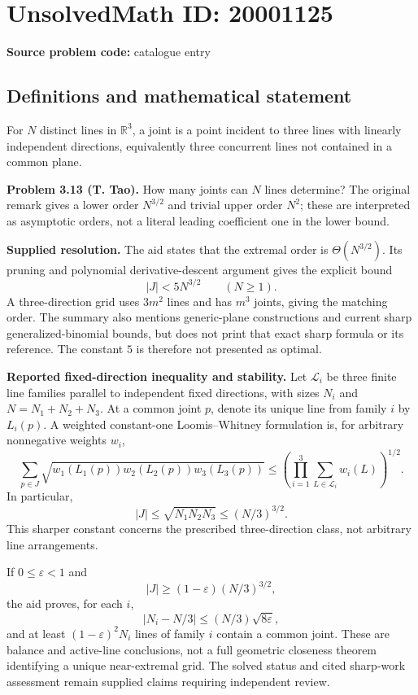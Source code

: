 \documentclass[11pt]{article}
\newcommand{\R}{\mathbb{R}}
\begin{document}
\section*{UnsolvedMath ID: 20001125}
\textbf{Source problem code:} catalogue entry
\subsection{Definitions and mathematical statement}
For $N$ distinct lines in $\R^3$, a joint is a point incident to three lines with linearly independent directions, equivalently three concurrent lines not contained in a common plane.

\textbf{Problem 3.13 (T. Tao).} How many joints can $N$ lines determine? The original remark gives a lower order $N^{3/2}$ and trivial upper order $N^2$; these are interpreted as asymptotic orders, not a literal leading coefficient one in the lower bound.

\textbf{Supplied resolution.} The aid states that the extremal order is $\Theta(N^{3/2})$. Its pruning and polynomial derivative-descent argument gives the explicit bound
\[
 |J|<5N^{3/2}\qquad(N\geq1).
\]
A three-direction grid uses $3m^2$ lines and has $m^3$ joints, giving the matching order. The summary also mentions generic-plane constructions and current sharp generalized-binomial bounds, but does not print that exact sharp formula or its reference. The constant $5$ is therefore not presented as optimal.

\textbf{Reported fixed-direction inequality and stability.} Let $\mathcal L_i$ be three finite line families parallel to independent fixed directions, with sizes $N_i$ and $N=N_1+N_2+N_3$. At a common joint $p$, denote its unique line from family $i$ by $L_i(p)$. A weighted constant-one Loomis--Whitney formulation is, for arbitrary nonnegative weights $w_i$,
\[
 \sum_{p\in J}\sqrt{w_1(L_1(p))w_2(L_2(p))w_3(L_3(p))}
 \leq\left(\prod_{i=1}^3\sum_{L\in\mathcal L_i}w_i(L)\right)^{1/2}.
\]
In particular,
\[
 |J|\leq\sqrt{N_1N_2N_3}\leq(N/3)^{3/2}.
\]
This sharper constant concerns the prescribed three-direction class, not arbitrary line arrangements.

If $0\leq\varepsilon<1$ and
\[
 |J|\geq(1-\varepsilon)(N/3)^{3/2},
\]
the aid proves, for each $i$,
\[
 |N_i-N/3|\leq(N/3)\sqrt{8\varepsilon},
\]
and at least $(1-\varepsilon)^2N_i$ lines of family $i$ contain a common joint. These are balance and active-line conclusions, not a full geometric closeness theorem identifying a unique near-extremal grid. The solved status and cited sharp-work assessment remain supplied claims requiring independent review.
\end{document}
